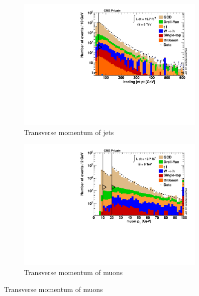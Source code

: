 \begin{figure}[!p]
  \begin{subfigure}[b]{0.495\textwidth}
    \centering
    \includegraphics[width=\textwidth]{plots/nTL_jetpt.pdf}
    \caption{Transverse momentum of jets\label{fig:ntljetpt}}
  \end{subfigure}
  \begin{subfigure}[b]{0.495\textwidth}
    \centering
    \includegraphics[width=\textwidth]{plots/nTL_mupt.pdf}
    \caption{Transverse momentum of muons \label{fig:ntlmupt}}
  \end{subfigure}


\end{figure}
